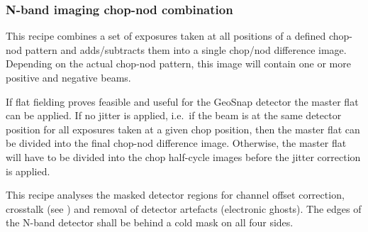 
\subsubsection{N-band imaging chop-nod combination}
\label{img_n_chopnod}
\label{rec:img_n_chopnod}
\label{rec:metis_n_img_chopnod}
\label{sssec:img_n_chopnod}

This recipe combines a set of exposures taken at all positions of a
defined chop-nod pattern and adds/subtracts them into a single
chop/nod difference image. Depending on the actual chop-nod pattern,
this image will contain one or more positive and negative beams.

If flat fielding proves feasible and useful for the GeoSnap detector
the master flat can be applied. If no jitter is applied, i.e.\ if the
beam is at the same detector position for all exposures taken at a
given chop position, then the master flat can be divided into the
final chop-nod difference image. Otherwise, the master flat will have
to be divided into the chop half-cycle images before the jitter
correction is applied.

This recipe analyses the masked detector regions for channel offset correction, crosstalk (see \cite{matisse_minutes}) and removal of detector artefacts (electronic ghosts).
The edges of the N-band detector shall be behind a cold mask on all four sides.


